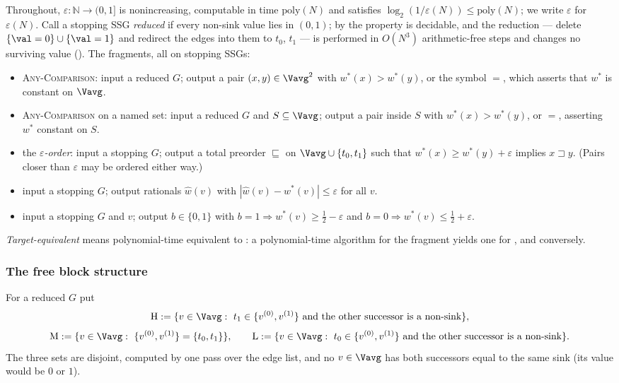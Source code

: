 \begin{definition}\label{def:wo-fragments}
Throughout, $\varepsilon:\mathbb N\to(0,1]$ is nonincreasing, computable in
time $\mathrm{poly}(N)$ and satisfies $\log_2(1/\varepsilon(N))\le
\mathrm{poly}(N)$; we write $\varepsilon$ for $\varepsilon(N)$. Call a stopping
SSG \emph{reduced} if every non-sink value lies in $(0,1)$; by
 the property is decidable, and the reduction --- delete
$\{\val=0\}\cup\{\val=1\}$ and redirect the edges into them to $t_0$, $t_1$ ---
is performed in $O(N^{3})$ arithmetic-free steps and changes no surviving value
(). The fragments, all on stopping SSGs:
\begin{itemize}[leftmargin=2.2em]
\item[(\textsc{Any})] \textsc{Any-Comparison}: input a reduced $G$; output a
  pair $(x,y)\in\Vavg^{2}$ with $w^\ast(x)>w^\ast(y)$, or the symbol $=$,
  which asserts that $w^\ast$ is constant on $\Vavg$.
\item[(\textsc{Any}$_S$)] \textsc{Any-Comparison} on a named set: input a
  reduced $G$ and $S\subseteq\Vavg$; output a pair inside $S$ with
  $w^\ast(x)>w^\ast(y)$, or $=$, asserting $w^\ast$ constant on $S$.
\item[(\textsc{Ord}$_\varepsilon$)] the \emph{$\varepsilon$-order}: input a
  stopping $G$; output a total preorder $\sqsubseteq$ on
  $\Vavg\cup\{t_0,t_1\}$ such that $w^\ast(x)\ge w^\ast(y)+\varepsilon$ implies
  $x\sqsupset y$. (Pairs closer than $\varepsilon$ may be ordered either way.)
\item[(\textsc{App}$_\varepsilon$)] input a stopping $G$; output rationals
  $\hat w(v)$ with $|\hat w(v)-w^\ast(v)|\le\varepsilon$ for all $v$.
\item[(\textsc{Gap}$_\varepsilon$)] input a stopping $G$ and $v$; output
  $b\in\{0,1\}$ with $b=1\Rightarrow w^\ast(v)\ge\tfrac12-\varepsilon$ and
  $b=0\Rightarrow w^\ast(v)\le\tfrac12+\varepsilon$.
\end{itemize}
\emph{Target-equivalent} means polynomial-time equivalent to :
a polynomial-time algorithm for the fragment yields one for ,
and conversely.
\end{definition}

\subsubsection*{The free block structure}

\begin{definition}\label{def:wo-blocks}
For a reduced $G$ put
\[
  \mathrm H:=\{v\in\Vavg:\ t_1\in\{v^{(0)},v^{(1)}\}\ \text{and the other successor is a non-sink}\},
\]
\[
  \mathrm M:=\{v\in\Vavg:\ \{v^{(0)},v^{(1)}\}=\{t_0,t_1\}\},\qquad
  \mathrm L:=\{v\in\Vavg:\ t_0\in\{v^{(0)},v^{(1)}\}\ \text{and the other successor is a non-sink}\}.
\]
The three sets are disjoint, computed by one pass over the edge list, and no
$v\in\Vavg$ has both successors equal to the same sink (its value would be $0$
or $1$).
\end{definition}

